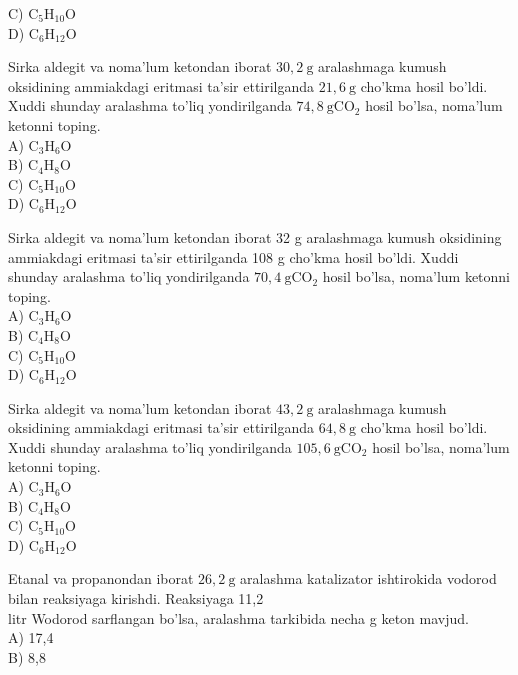 C) $\mathrm{C}_{5} \mathrm{H}_{10} \mathrm{O}$\\
D) $\mathrm{C}_{6} \mathrm{H}_{12} \mathrm{O}$
  \item Sirka aldegit va noma'lum ketondan iborat $30,2 \mathrm{~g}$ aralashmaga kumush oksidining ammiakdagi eritmasi ta'sir ettirilganda $21,6 \mathrm{~g}$ cho'kma hosil bo'ldi. Xuddi shunday aralashma to'liq yondirilganda $74,8 \mathrm{~g} \mathrm{CO}_{2}$ hosil bo'lsa, noma'lum ketonni toping.\\
A) $\mathrm{C}_{3} \mathrm{H}_{6} \mathrm{O}$\\
B) $\mathrm{C}_{4} \mathrm{H}_{8} \mathrm{O}$\\
C) $\mathrm{C}_{5} \mathrm{H}_{10} \mathrm{O}$\\
D) $\mathrm{C}_{6} \mathrm{H}_{12} \mathrm{O}$
  \item Sirka aldegit va noma'lum ketondan iborat 32 g aralashmaga kumush oksidining ammiakdagi eritmasi ta'sir ettirilganda 108 g cho'kma hosil bo'ldi. Xuddi shunday aralashma to'liq yondirilganda $70,4 \mathrm{~g} \mathrm{CO}_{2}$ hosil bo'lsa, noma'lum ketonni toping.\\
A) $\mathrm{C}_{3} \mathrm{H}_{6} \mathrm{O}$\\
B) $\mathrm{C}_{4} \mathrm{H}_{8} \mathrm{O}$\\
C) $\mathrm{C}_{5} \mathrm{H}_{10} \mathrm{O}$\\
D) $\mathrm{C}_{6} \mathrm{H}_{12} \mathrm{O}$
  \item Sirka aldegit va noma'lum ketondan iborat $43,2 \mathrm{~g}$ aralashmaga kumush oksidining ammiakdagi eritmasi ta'sir ettirilganda $64,8 \mathrm{~g}$ cho'kma hosil bo'ldi. Xuddi shunday aralashma to'liq yondirilganda $105,6 \mathrm{~g} \mathrm{CO}_{2}$ hosil bo'lsa, noma'lum ketonni toping.\\
A) $\mathrm{C}_{3} \mathrm{H}_{6} \mathrm{O}$\\
B) $\mathrm{C}_{4} \mathrm{H}_{8} \mathrm{O}$\\
C) $\mathrm{C}_{5} \mathrm{H}_{10} \mathrm{O}$\\
D) $\mathrm{C}_{6} \mathrm{H}_{12} \mathrm{O}$
  \item Etanal va propanondan iborat $26,2 \mathrm{~g}$ aralashma katalizator ishtirokida vodorod bilan reaksiyaga kirishdi. Reaksiyaga 11,2\\
litr Wodorod sarflangan bo'lsa, aralashma tarkibida necha g keton mavjud.\\
A) 17,4\\
B) 8,8\\

